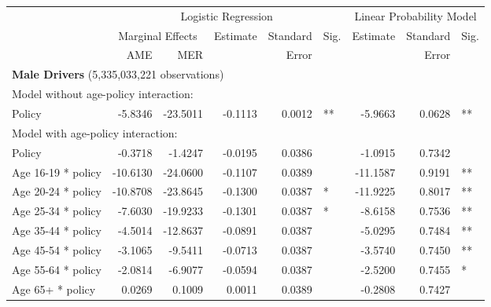 
\begin{table}%
\centering 
\begin{tabular}{l r r r r l r r l} 

\hline 
 
 & \multicolumn{5}{c}{Logistic Regression}  & \multicolumn{3}{c}{Linear Probability Model} \\ 

 \cmidrule(lr){2-6}\cmidrule(lr){7-9} 
 & \multicolumn{2}{c}{Marginal Effects} & Estimate & Standard & Sig. & Estimate & Standard & Sig. \\ 

 \cmidrule(lr){2-3} 
 &   AME &  MER  &          &  Error   &      &          &  Error   &     \\ 

\hline 
 
\multicolumn{8}{l}{\textbf{Male Drivers} (5,335,033,221 observations)} \\ 

\hline
\multicolumn{8}{l}{Model without age-policy interaction: } \\ 
Policy                   &  -5.8346        &  -23.5011       &  -0.1113        &  0.0012       &   **       &  -5.9663        &  0.0628       &   **       \\ 
\hline
\multicolumn{8}{l}{Model with age-policy interaction: } \\ 
Policy                   &  -0.3718        &  -1.4247       &  -0.0195        &  0.0386       &            &  -1.0915        &  0.7342       &            \\ 
Age 16-19 * policy   &  -10.6130        &  -24.0600       &  -0.1107        &  0.0389       &            &  -11.1587        &  0.9191       &   **       \\ 
Age 20-24 * policy   &  -10.8708        &  -23.8645       &  -0.1300        &  0.0387       &    *       &  -11.9225        &  0.8017       &   **       \\ 
Age 25-34 * policy   &  -7.6030        &  -19.9233       &  -0.1301        &  0.0387       &    *       &  -8.6158        &  0.7536       &   **       \\ 
Age 35-44 * policy   &  -4.5014        &  -12.8637       &  -0.0891        &  0.0387       &            &  -5.0295        &  0.7484       &   **       \\ 
Age 45-54 * policy   &  -3.1065        &  -9.5411       &  -0.0713        &  0.0387       &            &  -3.5740        &  0.7450       &   **       \\ 
Age 55-64 * policy   &  -2.0814        &  -6.9077       &  -0.0594        &  0.0387       &            &  -2.5200        &  0.7455       &    *       \\ 
Age 65+ * policy   &  0.0269        &  0.1009       &  0.0011        &  0.0389       &            &  -0.2808        &  0.7427       &            \\ 


\end{tabular}
\end{table}
